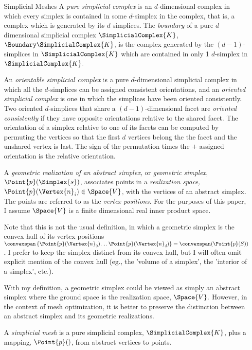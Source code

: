 \begin{plSection}{Simplicial Meshes}
A {\it pure simplicial complex} is an $d$-dimensional complex
in which every simplex is contained in some $d$-simplex in the complex,
that is, a complex which is generated by its $d$-simplices.
The {\it boundary} of a pure $d$-dimensional simplicial complex $\SimplicialComplex{K}$,
$\Boundary \SimplicialComplex{K}$,
is the complex generated by the $(d-1)$-simplices in $\SimplicialComplex{K}$
which are contained in only 1 $d$-simplex in $\SimplicialComplex{K}$.

An {\it orientable simplicial complex} is a pure $d$-dimensional simplicial complex
in which all the $d$-simplices can be assigned consistent orientations,
and an {\it oriented simplicial complex} is one in which the simplices
have been oriented consistently.
Two oriented $d$-simplices that share a $(d-1)$-dimensional facet
are {\it oriented consistently} if they have opposite orientations
relative to the shared facet. The orientation of a simplex relative to
one of its facets can be computed by permuting the vertices so that
the first $d$ vertices belong the the facet and the unshared vertex is last.
The sign of the permutation times the $\pm$ assigned orientation
is the relative orientation.

A {\it geometric realization of an abstract simplex,}
or {\it geometric simplex}, $\Point{p}(\Simplex{s})$,  associates points
in a {\it realization space,}
$\Point{p} ( \Vertex{n}_i ) \in \Space{V}$, with the vertices of an abstract simplex.
The points are referred to as the {\it vertex positions.}
For the purposes of this paper,
I assume $\Space{V}$ is
a finite dimensional real inner product space.

Note that this is not the usual definition,
in which a geometric simplex is the convex hull of its vertex positions
$\convexspan \left\{ \Point{p}(\Vertex{n}_0) \ldots \Point{p}(\Vertex{n}_d) \right\} 
= \convexspan ( \Point{p}(S) )$.
I prefer to keep the simplex distinct from its convex hull,
but I will often omit explicit mention of the convex hull
(eg., the 'volume of a simplex', the 'interior of a simplex', etc.).

With my definition,
a geometric simplex could be viewed as simply an abstract simplex
where the ground space is the realization space, $\Space{V}$.
However, in the context of mesh optimization,
it is better to preserve the distinction between an abstract simplex
and its geometric realizations.

A {\it simplicial mesh} is a pure simplicial complex, $\SimplicialComplex{K}$,
plus a mapping, $\Point{p}()$, from abstract vertices to points.


\end{plSection}
